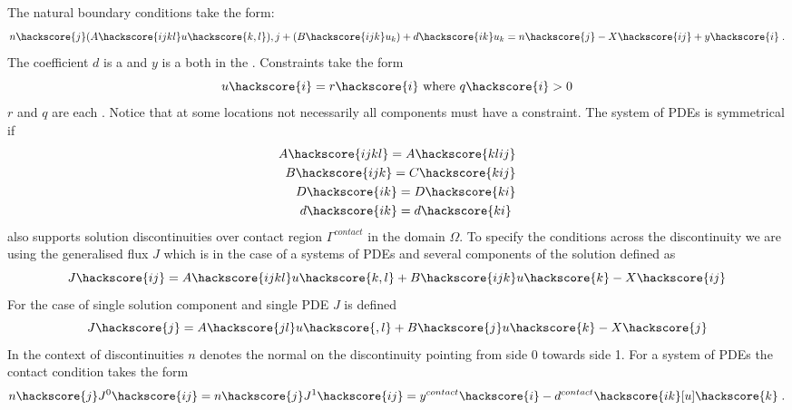 The natural boundary conditions  take the form:
\begin{equation}\label{LINEARPDE.SYSTEM.2}
n\hackscore{j}(A\hackscore{ijkl} u\hackscore{k,l}){,j}+(B\hackscore{ijk} u_k)+d\hackscore{ik} u_k=n\hackscore{j}-X\hackscore{ij}+y\hackscore{i}  \;.
\end{equation}
The coefficient $d$ is a \RankTwo and $y$ is a  
\RankOne both in the \FunctionOnBoundary. Constraints  take the form
\begin{equation}\label{LINEARPDE.SYSTEM.3}
u\hackscore{i}=r\hackscore{i} \mbox{ where } q\hackscore{i}>0
\end{equation}
$r$ and $q$ are each \RankOne. Notice that at some locations not necessarily all components must 
have a constraint. The system of PDEs is symmetrical  if
\begin{eqnarray}\label{LINEARPDE.SYSTEM.4}
A\hackscore{ijkl}=A\hackscore{klij} \\
B\hackscore{ijk}=C\hackscore{kij} \\
D\hackscore{ik}=D\hackscore{ki} \\
d\hackscore{ik}=d\hackscore{ki} \
\end{eqnarray}
\LinearPDE also supports solution discontinuities  over contact region $\Gamma^{contact}$
in the domain $\Omega$. To specify the conditions across the discontinuity we are using the
generalised flux $J$ which is in the case of a systems of PDEs and several components of the solution
defined as 
\begin{equation}\label{LINEARPDE.SYSTEM.5}
J\hackscore{ij}=A\hackscore{ijkl}u\hackscore{k,l}+B\hackscore{ijk}u\hackscore{k}-X\hackscore{ij}
\end{equation}
For the case of single solution component and single PDE $J$ is defined
\begin{equation}\label{LINEARPDE.SINGLE.5}
J\hackscore{j}=A\hackscore{jl}u\hackscore{,l}+B\hackscore{j}u\hackscore{k}-X\hackscore{j}
\end{equation}
In the context of discontinuities  $n$ denotes the normal on the 
discontinuity pointing from side 0 towards side 1. For a system of PDEs
the contact condition takes the form
\begin{equation}\label{LINEARPDE.SYSTEM.6}
n\hackscore{j} J^{0}\hackscore{ij}=n\hackscore{j} J^{1}\hackscore{ij}=y^{contact}\hackscore{i} - d^{contact}\hackscore{ik} [u]\hackscore{k} \; .
\end{equation}
